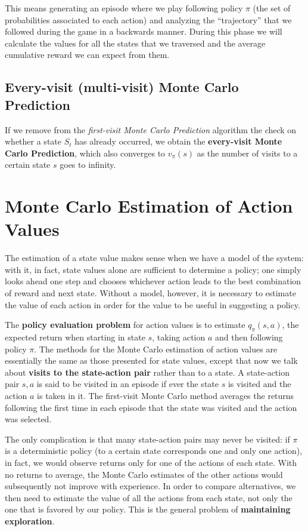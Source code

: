 This means generating an episode where we play following policy $\pi$ (the set of probabilities associated to each action) and analyzing the ``trajectory'' that we followed during the game in a backwards manner. During this phase we will calculate the values for all the states that we traversed and the average cumulative reward we can expect from them.

\subsection{Every-visit (multi-visit) Monte Carlo Prediction}
If we remove from the \textit{first-visit Monte Carlo Prediction} algorithm the check on whether a state $S_t$ has already occurred, we obtain the \textbf{every-visit Monte Carlo Prediction}, which also converges to $v_\pi (s)$ as the number of visits to a certain state $s$ goes to infinity.

\section{Monte Carlo Estimation of Action Values}
The estimation of a state value makes sense when we have a model of the system: with it, in fact, state values alone are sufficient to determine a policy; one simply looks ahead one step and chooses whichever action leads to the best combination of reward and next state. Without a model, however, it is necessary to estimate the value of each action in order for the value to be useful in suggesting a policy. 

The \textbf{policy evaluation problem} for action values is to estimate $q_\pi (s,a)$, the expected return when starting in state $s$, taking action $a$ and then following policy $\pi$. The methods for the Monte Carlo estimation of action values are essentially the same as those presented for state values, except that now we talk about \textbf{visits to the state-action pair} rather than to a state. A state-action pair $s,a$ is said to be visited in an episode if ever the state $s$ is visited and the action $a$ is taken in it. The first-visit Monte Carlo method averages the returns following the first time in each episode that the state was visited and the action was selected.

The only complication is that many state-action pairs may never be visited: if $\pi$ is a deterministic policy (to a certain state corresponds one and only one action), in fact, we would observe returns only for one of the actions of each state. With no returns to average, the Monte Carlo estimates of the other actions would subsequently not improve with experience. In order to compare alternatives, we then need to estimate the value of all the actions from each state, not only the one that is favored by our policy. This is the general problem of \textbf{maintaining exploration}.

